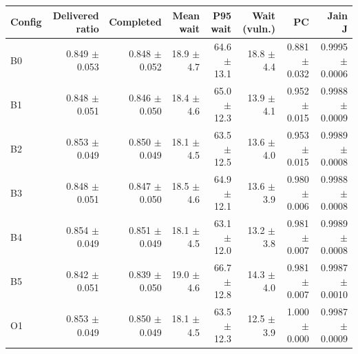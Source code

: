 \begin{tabular}{lrrrrrrr}
\hline
Config & Delivered ratio & Completed & Mean wait & P95 wait & Wait (vuln.) & PC & Jain J \\\hline
B0 & 0.849 $\pm$ 0.053 & 0.848 $\pm$ 0.052 & 18.9 $\pm$ 4.7 & 64.6 $\pm$ 13.1 & 18.8 $\pm$ 4.4 & 0.881 $\pm$ 0.032 & 0.9995 $\pm$ 0.0006 \\
B1 & 0.848 $\pm$ 0.051 & 0.846 $\pm$ 0.050 & 18.4 $\pm$ 4.6 & 65.0 $\pm$ 12.3 & 13.9 $\pm$ 4.1 & 0.952 $\pm$ 0.015 & 0.9988 $\pm$ 0.0009 \\
B2 & 0.853 $\pm$ 0.049 & 0.850 $\pm$ 0.049 & 18.1 $\pm$ 4.5 & 63.5 $\pm$ 12.5 & 13.6 $\pm$ 4.0 & 0.953 $\pm$ 0.015 & 0.9989 $\pm$ 0.0008 \\
B3 & 0.848 $\pm$ 0.051 & 0.847 $\pm$ 0.050 & 18.5 $\pm$ 4.6 & 64.9 $\pm$ 12.1 & 13.6 $\pm$ 3.9 & 0.980 $\pm$ 0.006 & 0.9988 $\pm$ 0.0008 \\
B4 & 0.854 $\pm$ 0.049 & 0.851 $\pm$ 0.049 & 18.1 $\pm$ 4.5 & 63.1 $\pm$ 12.0 & 13.2 $\pm$ 3.8 & 0.981 $\pm$ 0.007 & 0.9989 $\pm$ 0.0008 \\
B5 & 0.842 $\pm$ 0.051 & 0.839 $\pm$ 0.050 & 19.0 $\pm$ 4.6 & 66.7 $\pm$ 12.8 & 14.3 $\pm$ 4.0 & 0.981 $\pm$ 0.007 & 0.9987 $\pm$ 0.0010 \\
O1 & 0.853 $\pm$ 0.049 & 0.850 $\pm$ 0.049 & 18.1 $\pm$ 4.5 & 63.5 $\pm$ 12.3 & 12.5 $\pm$ 3.9 & 1.000 $\pm$ 0.000 & 0.9987 $\pm$ 0.0009 \\
\hline\end{tabular}
